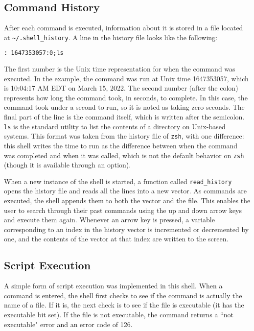 \documentclass[12pt,twoside]{report} %
\begin{document}
	\subsection{Command History} \label{sec:command-history}
	After each command is executed, information about it is stored in a file located at \verb|~/.shell_history|. A line in the history file looks like the following:
	
	\begin{lstlisting}[caption={Example line in a shell history file}]
: 1647353057:0;ls\end{lstlisting}

	The first number is the Unix time representation for when the command was executed. In the example, the command was run at Unix time 1647353057, which is 10:04:17 AM EDT on March 15, 2022. The second number (after the colon) represents how long the command took, in seconds, to complete. In this case, the command took under a second to run, so it is noted as taking zero seconds. The final part of the line is the command itself, which is written after the semicolon. \verb|ls| is the standard utility to list the contents of a directory on Unix-based systems. This format was taken from the history file of \verb|zsh|, with one difference: this shell writes the time to run as the difference between when the command was completed and when it was called, which is not the default behavior on \verb|zsh| (though it is available through an option).
	
	When a new instance of the shell is started, a function called \verb|read_history| opens the history file and reads all the lines into a new vector. As commands are executed, the shell appends them to both the vector and the file. This enables the user to search through their past commands using the up and down arrow keys and execute them again. Whenever an arrow key is pressed, a variable corresponding to an index in the history vector is incremented or decremented by one, and the contents of the vector at that index are written to the screen.
	
	\subsection{Script Execution} \label{sec:script-execution}
	A simple form of script execution was implemented in this shell. When a command is entered, the shell first checks to see if the command is actually the name of a file. If it is, the next check is to see if the file is executable (it has the executable bit set). If the file is not executable, the command returns a ``not executable" error and an error code of 126.
	
\end{document}
